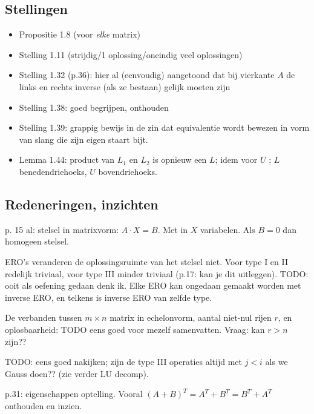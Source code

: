 \documentclass{article}
\begin{document}
\subsection{Stellingen}

\begin{itemize}
    \item Propositie 1.8 (voor \emph{elke} matrix) 
    \item Stelling 1.11 (strijdig/1 oplossing/oneindig veel oplossingen) 
    \item Stelling 1.32 (p.36): hier al (eenvoudig) aangetoond dat bij vierkante $A$ de links en rechts inverse (als ze bestaan) gelijk moeten zijn 
    \item Stelling 1.38: goed begrijpen, onthouden
    \item Stelling 1.39: grappig bewijs in de zin dat equivalentie wordt bewezen in vorm van slang die zijn eigen staart bijt. 
    \item Lemma 1.44: product van $L_1$ en $L_2$ is opnieuw een $L$; idem voor $U$ ; $L$ benedendriehoeks, $U$ bovendriehoeks. 
\end{itemize}

\subsection{Redeneringen, inzichten}

p. 15 al: stelsel in matrixvorm: $A\cdot X=B$. Met in $X$ variabelen. Als $B=0$ dan homogeen stelsel. 

ERO's veranderen de oplossingsruimte van het stelsel niet. Voor type I en II redelijk triviaal, voor type III minder triviaal (p.17: kan je dit uitleggen). TODO: ooit als oefening gedaan denk ik. 
Elke ERO kan ongedaan gemaakt worden met inverse ERO, en telkens is inverse ERO van zelfde type. 

De verbanden tussen $m \times n$ matrix in echelonvorm, aantal niet-nul rijen $r$, en oplosbaarheid: TODO eens goed voor mezelf samenvatten. Vraag: kan $r > n$  zijn?? 

TODO: eens goed nakijken; zijn de type III operaties altijd met $j<i$ als we Gauss doen?? (zie verder LU decomp). 

p.31: eigenschappen optelling. Vooral $(A+B)^T = A^T + B^T =  B^T+A^T  $ onthouden en inzien. 
\end{document}
